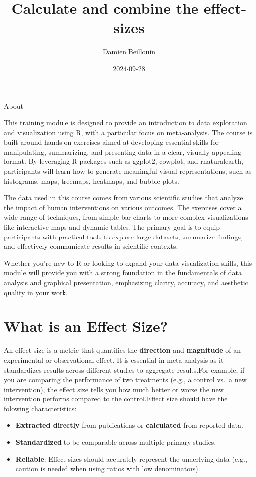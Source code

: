 \documentclass[
]{book}
\title{Calculate and combine the effect-sizes}
\author{Damien Beillouin}
\date{2024-09-28}
\providecommand{\tightlist}{%
  \setlength{\itemsep}{0pt}\setlength{\parskip}{0pt}}
\begin{document}
\maketitle

{
\setcounter{tocdepth}{1}
\tableofcontents
}
About

This training module is designed to provide an introduction to data exploration and visualization using R, with a particular focus on meta-analysis. The course is built around hands-on exercises aimed at developing essential skills for manipulating, summarizing, and presenting data in a clear, visually appealing format. By leveraging R packages such as ggplot2, cowplot, and rnaturalearth, participants will learn how to generate meaningful visual representations, such as histograms, maps, treemaps, heatmaps, and bubble plots.

The data used in this course comes from various scientific studies that analyze the impact of human interventions on various outcomes. The exercises cover a wide range of techniques, from simple bar charts to more complex visualizations like interactive maps and dynamic tables. The primary goal is to equip participants with practical tools to explore large datasets, summarize findings, and effectively communicate results in scientific contexts.

Whether you're new to R or looking to expand your data visualization skills, this module will provide you with a strong foundation in the fundamentals of data analysis and graphical presentation, emphasizing clarity, accuracy, and aesthetic quality in your work.

\chapter{What is an Effect Size?}\label{what-is-an-effect-size}

An effect size is a metric that quantifies the \textbf{direction} and \textbf{magnitude} of an experimental or observational effect.
It is essential in meta-analysis as it standardizes results across different studies to aggregate results.For example, if you are comparing the performance of two treatments (e.g., a control vs.~a new intervention), the effect size tells you how much better or worse the new intervention performs compared to the control.Effect size should have the folowing characteristics:

\begin{itemize}
\tightlist
\item
  \textbf{Extracted directly} from publications or \textbf{calculated} from reported data.
\item
  \textbf{Standardized} to be comparable across multiple primary studies.
\item
  \textbf{Reliable}: Effect sizes should accurately represent the underlying data (e.g., caution is needed when using ratios with low denominators).
\end{itemize}
\end{document}
